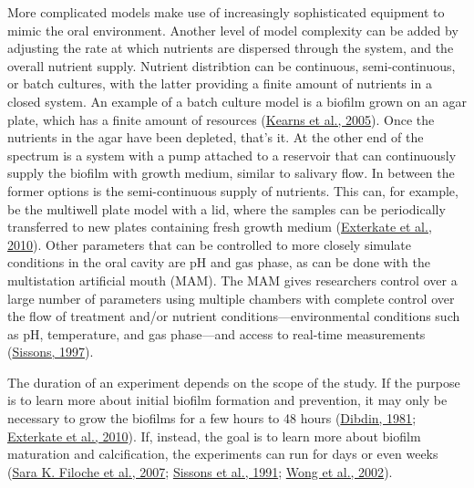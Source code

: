 \documentclass[
  letterpaper,
]{book}
\begin{document}
More complicated models make use of increasingly sophisticated equipment
to mimic the oral environment. Another level of model complexity can be
added by adjusting the rate at which nutrients are dispersed through the
system, and the overall nutrient supply. Nutrient distribtion can be
continuous, semi-continuous, or batch cultures, with the latter
providing a finite amount of nutrients in a closed system. An example of
a batch culture model is a biofilm grown on an agar plate, which has a
finite amount of resources
(\protect\hyperlink{ref-kearnsMasterRegulator2005}{Kearns et al.,
2005}). Once the nutrients in the agar have been depleted, that's it. At
the other end of the spectrum is a system with a pump attached to a
reservoir that can continuously supply the biofilm with growth medium,
similar to salivary flow. In between the former options is the
semi-continuous supply of nutrients. This can, for example, be the
multiwell plate model with a lid, where the samples can be periodically
transferred to new plates containing fresh growth medium
(\protect\hyperlink{ref-extercateAAA2010}{Exterkate et al., 2010}).
Other parameters that can be controlled to more closely simulate
conditions in the oral cavity are pH and gas phase, as can be done with
the multistation artificial mouth (MAM). The MAM gives researchers
control over a large number of parameters using multiple chambers with
complete control over the flow of treatment and/or nutrient
conditions---environmental conditions such as pH, temperature, and gas
phase---and access to real-time measurements
(\protect\hyperlink{ref-sissonsArtificialPlaque1997}{Sissons, 1997}).

The duration of an experiment depends on the scope of the study. If the
purpose is to learn more about initial biofilm formation and prevention,
it may only be necessary to grow the biofilms for a few hours to 48
hours (\protect\hyperlink{ref-dibdinDiffusionSugars1981}{Dibdin, 1981};
\protect\hyperlink{ref-extercateAAA2010}{Exterkate et al., 2010}). If,
instead, the goal is to learn more about biofilm maturation and
calcification, the experiments can run for days or even weeks
(\protect\hyperlink{ref-filocheFluorescenceAssay2007}{Sara K. Filoche et
al., 2007};
\protect\hyperlink{ref-sissonsMultistationPlaque1991}{Sissons et al.,
1991}; \protect\hyperlink{ref-wongCalciumPhosphate2002}{Wong et al.,
2002}).
\end{document}
